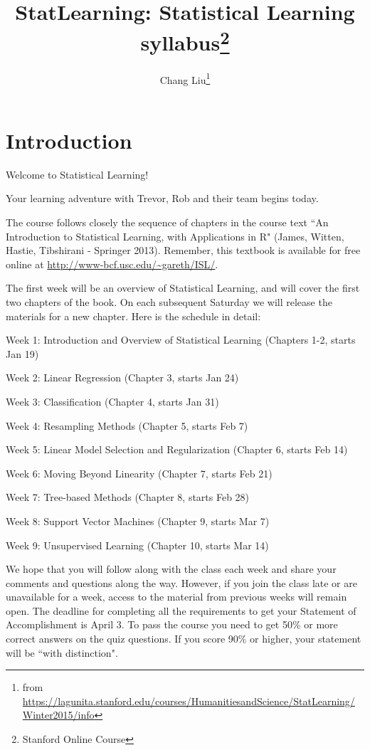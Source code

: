 \documentclass{article}
\title{StatLearning: Statistical Learning \\ syllabus\footnote{Stanford Online Course}}
\author{Chang Liu\footnote{from \url{https://lagunita.stanford.edu/courses/HumanitiesandScience/StatLearning/Winter2015/info}}}
\begin{document}
\maketitle

\section{Introduction}

\indent Welcome to Statistical Learning!

Your learning adventure with Trevor, Rob and their team begins today.

The course follows closely the sequence of chapters in the course text ``An Introduction to Statistical Learning, with Applications in R" (James, Witten, Hastie, Tibshirani - Springer 2013). Remember, this textbook is available for free online at \url{http://www-bcf.usc.edu/~gareth/ISL/}.

The first week will be an overview of Statistical Learning, and will cover the first two chapters of the book. On each subsequent Saturday we will release the materials for a new chapter. Here is the schedule in detail:

Week 1: Introduction and Overview of Statistical Learning (Chapters 1-2, starts Jan 19)

Week 2: Linear Regression (Chapter 3, starts Jan 24)

Week 3: Classification (Chapter 4, starts Jan 31)

Week 4: Resampling Methods (Chapter 5, starts Feb 7)

Week 5: Linear Model Selection and Regularization (Chapter 6, starts Feb 14)

Week 6: Moving Beyond Linearity (Chapter 7, starts Feb 21)

Week 7: Tree-based Methods (Chapter 8, starts Feb 28)

Week 8: Support Vector Machines (Chapter 9, starts Mar 7)

Week 9: Unsupervised Learning (Chapter 10, starts Mar 14)

We hope that you will follow along with the class each week and share your comments and questions along the way. However, if you join the class late or are unavailable for a week, access to the material from previous weeks will remain open. The deadline for completing all the requirements to get your Statement of Accomplishment is April 3.
To pass the course you need to get 50\% or more correct answers on the quiz questions. If you score 90\% or higher, your statement will be ``with distinction".
\end{document}
